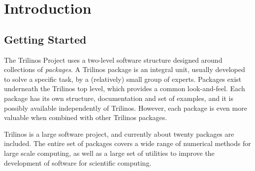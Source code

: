 % 
% 
% 
%  
%  
% 

\section{Introduction}


\subsection{Getting Started}
\label{sec:getting}

The Trilinos Project uses a two-level software structure designed around
collections of {\sl packages}. A Trilinos package is an integral unit,
usually developed to solve a specific task, by a (relatively) small
group of experts.  Packages exist underneath the Trilinos top level,
which provides a common look-and-feel. Each package has its own
structure, documentation and set of examples, and it is possibly
available independently of Trilinos. However, each package is even more
valuable when combined with other Trilinos packages.

\smallskip

Trilinos is a large software project, and currently about twenty
packages are included.  The entire set of packages covers a wide range
of numerical methods for large scale computing, as well as a large set
of utilities to improve the development of software for scientific
computing. 

